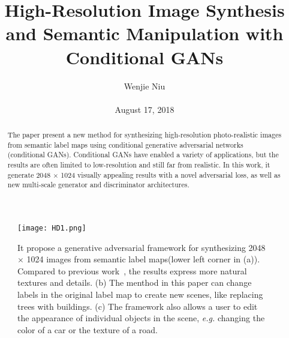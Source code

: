 \documentclass[10pt,twocolumn,letterpaper]{article}
\begin{document}
\title{High-Resolution Image Synthesis and Semantic Manipulation with Conditional GANs}

\author{Wenjie Niu\\\\ August 17, 2018}

\maketitle

 \begin{figure*}
 	\begin{center}
 		\texttt{[image: HD1.png]}
 	\end{center}
 	\caption{It propose a generative adversarial framework for synthesizing 2048 $\times$ 1024 images from semantic label maps(lower left corner in (a)). Compared to previous work~\cite{Chen2017Photographic}, the results express more natural textures and details. (b) The menthod in this paper can change labels in the original label map to create new scenes, like replacing trees with buildings. (c) The framework also allows a user to edit the appearance of individual objects in the scene, \emph{e.g.} changing the color of a car or the texture of a road.~\cite{TC2018High}}
 	\label{fig:HD1}
 \end{figure*}

\begin{abstract}
	The paper present a new method for synthesizing high-resolution photo-realistic images from semantic label maps using conditional generative adversarial networks (conditional GANs). Conditional GANs have enabled a variety of applications, but the results are often limited to low-resolution and still far from realistic. In this work, it generate 2048 $\times$ 1024 visually appealing results with a novel adversarial loss, as well as new multi-scale generator and discriminator architectures.
\end{abstract}
\end{document}
